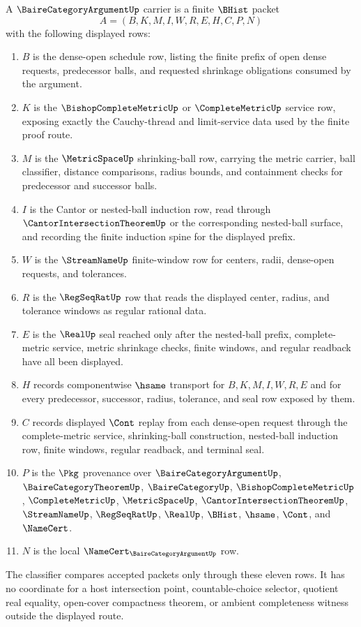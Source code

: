 \begin{definition}
\label{def:baire-category-argument-carrier}
A $\BaireCategoryArgumentUp$ carrier is a finite $\BHist$ packet
$$
A=(B,K,M,I,W,R,E,H,C,P,N)
$$
with the following displayed rows:
\begin{enumerate}
\item $B$ is the dense-open schedule row, listing the finite prefix of open dense requests, predecessor balls, and requested shrinkage obligations consumed by the argument.
\item $K$ is the $\BishopCompleteMetricUp$ or $\CompleteMetricUp$ service row, exposing exactly the Cauchy-thread and limit-service data used by the finite proof route.
\item $M$ is the $\MetricSpaceUp$ shrinking-ball row, carrying the metric carrier, ball classifier, distance comparisons, radius bounds, and containment checks for predecessor and successor balls.
\item $I$ is the Cantor or nested-ball induction row, read through $\CantorIntersectionTheoremUp$ or the corresponding nested-ball surface, and recording the finite induction spine for the displayed prefix.
\item $W$ is the $\StreamNameUp$ finite-window row for centers, radii, dense-open requests, and tolerances.
\item $R$ is the $\RegSeqRatUp$ row that reads the displayed center, radius, and tolerance windows as regular rational data.
\item $E$ is the $\RealUp$ seal reached only after the nested-ball prefix, complete-metric service, metric shrinkage checks, finite windows, and regular readback have all been displayed.
\item $H$ records componentwise $\hsame$ transport for $B,K,M,I,W,R,E$ and for every predecessor, successor, radius, tolerance, and seal row exposed by them.
\item $C$ records displayed $\Cont$ replay from each dense-open request through the complete-metric service, shrinking-ball construction, nested-ball induction row, finite windows, regular readback, and terminal seal.
\item $P$ is the $\Pkg$ provenance over $\BaireCategoryArgumentUp$, $\BaireCategoryTheoremUp$, $\BaireCategoryUp$, $\BishopCompleteMetricUp$, $\CompleteMetricUp$, $\MetricSpaceUp$, $\CantorIntersectionTheoremUp$, $\StreamNameUp$, $\RegSeqRatUp$, $\RealUp$, $\BHist$, $\hsame$, $\Cont$, and $\NameCert$.
\item $N$ is the local $\NameCert_{\BaireCategoryArgumentUp}$ row.
\end{enumerate}
The classifier compares accepted packets only through these eleven rows. It has no coordinate for a host intersection point, countable-choice selector, quotient real equality, open-cover compactness theorem, or ambient completeness witness outside the displayed route.
\end{definition}

